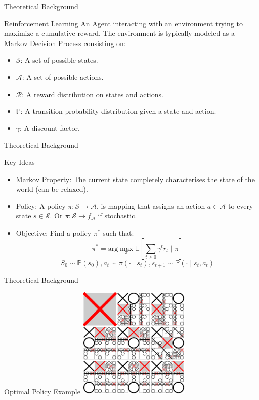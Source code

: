 \documentclass{beamer}
\begin{document}
	\begin{frame}{Theoretical Background}
		\begin{block}{Reinforcement Learning}
			An Agent interacting with an environment trying to maximize a cumulative reward. The environment is typically modeled as a Markov Decision Process consisting on:
			\begin{itemize}
				\item $ \mathcal{S} $: A set of possible states.
				\item $ \mathcal{A} $: A set of possible actions.
				\item $ \mathcal{R} $: A reward distribution on states and actions.
				\item $ \mathbb{P} $: A transition probability distribution given a state and action.
				\item $ \gamma $: A discount factor.
			\end{itemize}
		\end{block}
	\end{frame}
	
	\begin{frame}{Theoretical Background}
		\begin{block}{Key Ideas}
			\begin{itemize}
				\item Markov Property: The current state completely characterises the state of the world (can be relaxed).
				\item Policy: A policy $ \pi:\mathcal{S}\to\mathcal{A} $, is mapping that assigns an action $ a \in \mathcal{A} $ to every state $ s \in \mathcal{S}$. Or $ \pi:\mathcal{S}\to f_\mathcal{A} $ if stochastic.
				\item Objective: Find a policy $ \pi^* $ such that:
				$$ \pi^* = \text{arg} \max_{\pi} \mathbb{E} \left[ \sum_{t\geq0}\gamma^t r_t  \mid \pi \right] $$
				$$ S_0 \sim \mathbb{P} \left( s_0 \right), a_t \sim \pi \left(\cdot\mid s_t\right), s_{t+1} \sim \mathbb{P}\left(\cdot \mid s_t,a_t \right) $$
			\end{itemize}
		\end{block}
	\end{frame}
	
	\begin{frame}{Theoretical Background}
		\begin{block}{Optimal Policy Example}
			\centering
			\includegraphics[width=0.4\textwidth]{TicTacToe.png}
		\end{block}
	\end{frame}
	
\end{document}
